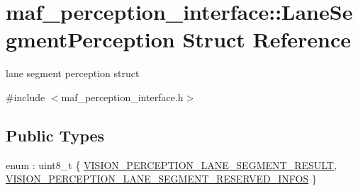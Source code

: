 \hypertarget{structmaf__perception__interface_1_1LaneSegmentPerception}{}\section{maf\+\_\+perception\+\_\+interface\+:\+:Lane\+Segment\+Perception Struct Reference}
\label{structmaf__perception__interface_1_1LaneSegmentPerception}


lane segment perception struct  




{\ttfamily \#include $<$maf\+\_\+perception\+\_\+interface.\+h$>$}

\subsection*{Public Types}
\begin{DoxyCompactItemize}
\item 
enum \+: uint8\+\_\+t \{ \hyperlink{structmaf__perception__interface_1_1LaneSegmentPerception_aabc223f0fc45ce0b775528cdb058e0a6abbf754a8d7d21a7d9ae906877ec0216b}{V\+I\+S\+I\+O\+N\+\_\+\+P\+E\+R\+C\+E\+P\+T\+I\+O\+N\+\_\+\+L\+A\+N\+E\+\_\+\+S\+E\+G\+M\+E\+N\+T\+\_\+\+R\+E\+S\+U\+LT}, 
\hyperlink{structmaf__perception__interface_1_1LaneSegmentPerception_aabc223f0fc45ce0b775528cdb058e0a6abdc4fd4a33a8a7bbd19788ff8604e23d}{V\+I\+S\+I\+O\+N\+\_\+\+P\+E\+R\+C\+E\+P\+T\+I\+O\+N\+\_\+\+L\+A\+N\+E\+\_\+\+S\+E\+G\+M\+E\+N\+T\+\_\+\+R\+E\+S\+E\+R\+V\+E\+D\+\_\+\+I\+N\+F\+OS}
 \}
\end{DoxyCompactItemize}
